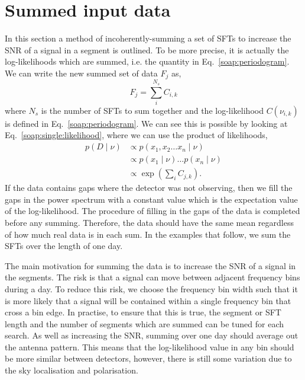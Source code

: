 \section{\label{soap:sumdata}Summed input data}
%
%
In this section a method of incoherently-summing a set of \glspl{SFT} to increase the \gls{SNR} of a signal in a segment is outlined. To be more precise, it is actually the log-likelihoods which are summed, i.e. the quantity in Eq.~\ref{soap:periodogram}. We can write the new summed set of data $F_j$ as,
%
\begin{equation}
F_j = \sum_{i}^{N_s}C_{i,k}
\end{equation}
%
where $N_s$ is the number of \glspl{SFT} to sum together and the log-likelihood $C(\nu_{i,k})$ is defined in Eq.~\ref{soap:periodogram}.
We can see this is possible by looking at Eq.~\ref{soap:single:likelihood}, where we can use the product of likelihoods,
%
\begin{equation}
\begin{split}
p(D \mid \nu) &\propto p(x_1,x_2 \ldots x_n \mid \nu) \\
&\propto p(x_1 \mid \nu) \ldots p(x_n \mid \nu) \\
&\propto \exp{\left( \sum_i C_{j,k}\right)}.
\end{split}
\end{equation}
%
If the data contains gaps where the detector was not observing, then we fill the gaps in the power spectrum with a constant value which is the expectation value of the log-likelihood. The procedure of filling in the gaps of the data is completed before any summing.  Therefore, the data should have the same mean regardless of how much real data is in each sum. In the examples that follow, we sum the \glspl{SFT} over the length of one day.

The main motivation for summing the data is to increase the \gls{SNR} of a signal in the segments. The risk is that a signal can move between adjacent frequency bins during a day. To reduce this risk, we choose the frequency bin width such that it is more likely that a signal will be contained within a single frequency bin that cross a bin edge. In practise, to ensure that this is true, the segment or \gls{SFT} length and the number of segments which are summed can be tuned for each search. As well as increasing the \gls{SNR}, summing over one day should average out the antenna pattern. This means that the log-likelihood value in any bin should be more similar between detectors, however, there is still some variation due to the sky localisation and polarisation.

